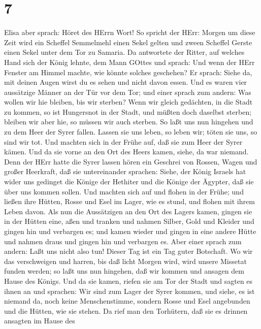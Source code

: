 \hypertarget{section-6}{%
\section{7}\label{section-6}}

 Elisa aber sprach: Höret des HErrn Wort! So spricht der
HErr: Morgen um diese Zeit wird ein Scheffel Semmelmehl einen Sekel
gelten und zween Scheffel Gerste einen Sekel unter dem Tor zu Samaria.
 Da antwortete der Ritter, auf welches Hand sich der König
lehnte, dem Mann GOttes und sprach: Und wenn der HErr Fenster am Himmel
machte, wie könnte solches geschehen? Er sprach: Siehe da, mit deinen
Augen wirst du es sehen und nicht davon essen.  Und es waren
vier aussätzige Männer an der Tür vor dem Tor; und einer sprach zum
andern: Was wollen wir hie bleiben, bis wir sterben?  Wenn
wir gleich gedächten, in die Stadt zu kommen, so ist Hungersnot in der
Stadt, und müßten doch daselbst sterben; bleiben wir aber hie, so müssen
wir auch sterben. So laßt uns nun hingehen und zu dem Heer der Syrer
fallen. Lassen sie uns leben, so leben wir; töten sie uns, so sind wir
tot.  Und machten sich in der Frühe auf, daß sie zum Heer
der Syrer kämen. Und da sie vorne an den Ort des Heers kamen, siehe, da
war niemand.  Denn der HErr hatte die Syrer lassen hören ein
Geschrei von Rossen, Wagen und großer Heerkraft, daß sie untereinander
sprachen: Siehe, der König Israels hat wider uns gedinget die Könige der
Hethiter und die Könige der Ägypter, daß sie über uns kommen sollen.
 Und machten sich auf und flohen in der Frühe; und ließen
ihre Hütten, Rosse und Esel im Lager, wie es stund, und flohen mit ihrem
Leben davon.  Als nun die Aussätzigen an den Ort des Lagers
kamen, gingen sie in der Hütten eine, aßen und tranken und nahmen
Silber, Gold und Kleider und gingen hin und verbargen es; und kamen
wieder und gingen in eine andere Hütte und nahmen draus und gingen hin
und verbargen es.  Aber einer sprach zum andern: Laßt uns
nicht also tun! Dieser Tag ist ein Tag guter Botschaft. Wo wir das
verschweigen und harren, bis daß licht Morgen wird, wird unsere Missetat
funden werden; so laßt uns nun hingehen, daß wir kommen und ansagen dem
Hause des Königs.  Und da sie kamen, riefen sie am Tor der
Stadt und sagten es ihnen an und sprachen: Wir sind zum Lager der Syrer
kommen, und siehe, es ist niemand da, noch keine Menschenstimme, sondern
Rosse und Esel angebunden und die Hütten, wie sie stehen. 
Da rief man den Torhütern, daß sie es drinnen ansagten im Hause des
